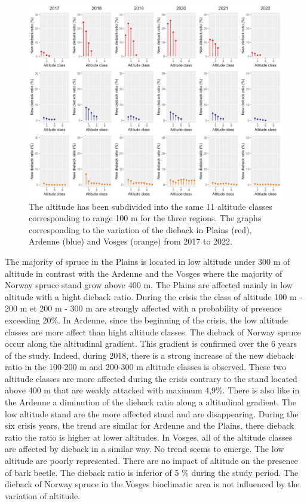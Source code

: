 \documentclass[3p,procedia]{elsarticle}
\begin{document}
\begin{figure}[htbp] 
\centering
	\includegraphics[width=\textwidth]{synthese_color_11_2022.png}
     \caption{The altitude has been subdivided into the same 11 altitude classes corresponding to range 100 m for the three regions. 
The graphs corresponding to the variation of the dieback in Plains (red), Ardenne (blue) and Vosges (orange) from 2017 to 2022.
}
	\label{alti_sco}
\end{figure}
The majority of spruce in the Plains is located in low altitude under 300 m of altitude in contrast with the Ardenne and the Vosges where the majority of Norway spruce stand grow above 400 m. 
The Plains are affected mainly in low altitude with a hight dieback ratio. 
During the crisis the class of altitude 100 m - 200 m et 200 m - 300 m are strongly affected with a probability of presence exceeding 20\%.
In Ardenne, since the beginning of the crisis, the low altitude classes are more affect than hight altitude classes.
The dieback of Norway spruce occur along the altitudinal gradient.
This gradient is confirmed over the 6 years of the study.
Indeed, during 2018, there is a strong increase of the new dieback ratio in the 100-200 m and 200-300 m altitude classes is observed. 
These two altitude classes are more affected during the crisis contrary to the stand located above 400 m that are weakly attacked with maximum 4,9\%.
There is also like in the Ardenne a diminution of the dieback ratio along a altitudinal gradient.
The low altitude stand are the more affected stand and are disappearing.
During the six crisis years, the trend are similar for Ardenne and the Plains, there dieback ratio the ratio is higher at lower altitudes. 
In Vosges, all of the altitude classes are affected by dieback in a similar way.
No trend seems to emerge.
The low altitude are poorly represented. 
There are no impact of altitude on the presence of bark beetle. 
The dieback ratio is inferior of 5 \% during the study period.
The dieback of Norway spruce in the Vosges bioclimatic area is not influenced by the variation of altitude.
\end{document}
